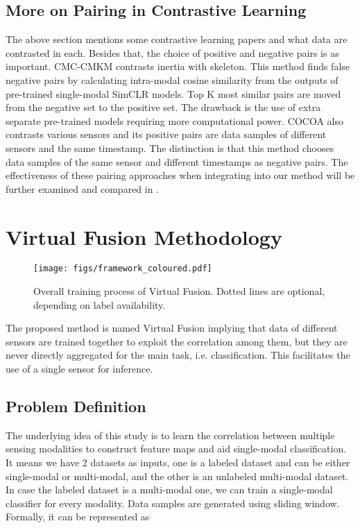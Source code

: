 \documentclass[conference]{IEEEtran}
\begin{document}
\subsection{More on Pairing in Contrastive Learning}
The above section mentions some contrastive learning papers and what data are contrasted in each. Besides that, the choice of positive and negative pairs is as important. CMC-CMKM \cite{Brinzea2022} contrasts inertia with skeleton. This method finds false negative pairs by calculating intra-modal cosine similarity from the outputs of pre-trained single-modal SimCLR models. Top K most similar pairs are moved from the negative set to the positive set. The drawback is the use of extra separate pre-trained models requiring more computational power. COCOA also contrasts various sensors and its positive pairs are data samples of different sensors and the same timestamp. The distinction is that this method chooses data samples of the same sensor and different timestamps as negative pairs. The effectiveness of these pairing approaches when integrating into our method will be further examined and compared in .



\section{Virtual Fusion Methodology}
\begin{figure*}[!t]
\captionsetup{justification=centering}
\centerline{\texttt{[image: figs/framework\_coloured.pdf]}}
\caption{Overall training process of Virtual Fusion. Dotted lines are optional, depending on label availability.}
\label{fig: framework}
\end{figure*}

The proposed method is named Virtual Fusion implying that data of different sensors are trained together to exploit the correlation among them, but they are never directly aggregated for the main task, i.e. classification. This facilitates the use of a single sensor for inference.

\subsection{Problem Definition}
\label{subsec: prob def}
The underlying idea of this study is to learn the correlation between multiple sensing modalities to construct feature maps and aid single-modal classification. It means we have 2 datasets as inputs, one is a labeled dataset and can be either single-modal or multi-modal, and the other is an unlabeled multi-modal dataset. In case the labeled dataset is a multi-modal one, we can train a single-modal classifier for every modality. Data samples are generated using sliding window. Formally, it can be represented as
\end{document}
